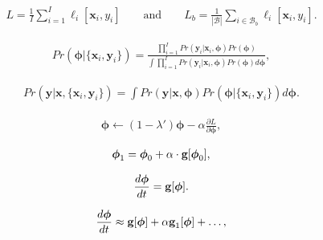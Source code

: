\documentclass[letterpaper,twoside,openany, titlepage,oldfontcommands,titles,dvipsnames]{memoir}
\begin{document}
\begin{eqnarray}
  L = \frac{1}{I} \sum_{i=1}^{I}\ell_{i}[\mathbf{x}_{i},y_{i}] \quad \quad \mbox{and}\quad\quad L_{b} = \frac{1}{|\mathcal{B}|} \sum_{i\in \mathcal{B}_{b}}\ell_{i}[\mathbf{x}_{i},y_{i}].
 \end{eqnarray}

\begin{eqnarray}
  Pr(\boldsymbol\phi|\{\mathbf{x}_{i},\mathbf{y}_{i}\}) = \frac{\prod_{i=1}^{I} Pr(\mathbf{y}_{i}|\mathbf{x}_{i},\boldsymbol\phi) Pr(\boldsymbol\phi)}{\int \prod_{i=1}^{I} Pr(\mathbf{y}_{i}|\mathbf{x}_{i},\boldsymbol\phi) Pr(\boldsymbol\phi)d\boldsymbol\phi } ,
 \end{eqnarray}

\begin{eqnarray}
  Pr(\mathbf{y}|\mathbf{x}, \{\mathbf{x}_{i},\mathbf{y}_{i}\}) = \int Pr(\mathbf{y}|\mathbf{x},\boldsymbol\phi) Pr(\boldsymbol\phi |\{\mathbf{x}_{i},\mathbf{y}_{i}\}) d\boldsymbol\phi.
 \end{eqnarray}

\begin{eqnarray}\label{eq:reg_weight_decay}
 \boldsymbol\phi \longleftarrow (1-\lambda') \boldsymbol\phi - \alpha \frac{\partial L}{\partial \boldsymbol\phi},
 \end{eqnarray}

\begin{eqnarray}\label{eq:reg_imp_discrete}
 \boldsymbol\phi_{1} = \boldsymbol\phi_{0} + \alpha \cdot\mbox{\bf g}[\boldsymbol\phi_0],
 \end{eqnarray}

\begin{eqnarray}
 \frac{d\boldsymbol\phi}{dt} =\mbox{\bf g}[\boldsymbol\phi].
 \end{eqnarray}

\begin{eqnarray}\label{eq:reg_imp_correction}
 \frac{d\boldsymbol\phi}{dt} \approx \mbox{\bf g}[\boldsymbol\phi] +\alpha \mbox{\bf g}_{1}[\boldsymbol\phi] + \ldots,
 \end{eqnarray}
\end{document}
